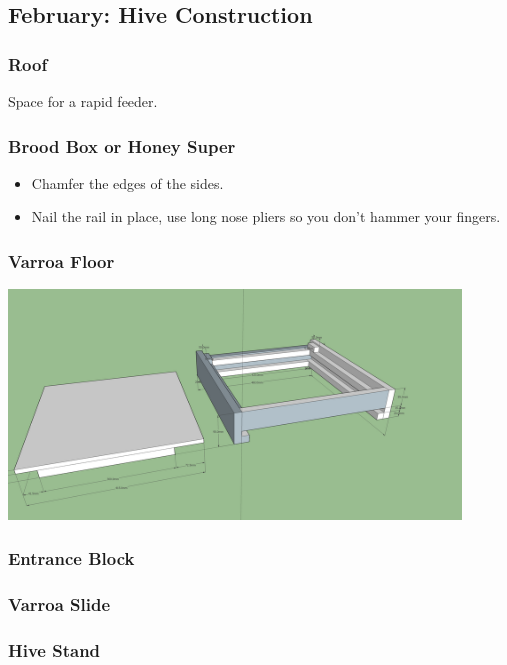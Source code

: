 \subsection{February: Hive Construction}


\subsubsection{Roof}

Space for a rapid feeder.


\subsubsection{Brood Box or Honey Super}

\begin{itemize}
    \item Chamfer the edges of the sides.
    \item Nail the rail in place, use long nose pliers so you don't hammer your fingers.
\end{itemize}

\subsubsection{Varroa Floor}

\includegraphics[width=0.9\textwidth]{../assets/varroa_floor.png}

\subsubsection{Entrance Block}

\subsubsection{Varroa Slide}

\subsubsection{Hive Stand}
